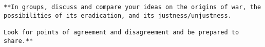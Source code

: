 \documentclass[letterpaper]{article}
\begin{document}
\begin{verbatim}
**In groups, discuss and compare your ideas on the origins of war, the possibilities of its eradication, and its justness/unjustness. 

Look for points of agreement and disagreement and be prepared to share.**
\end{verbatim}
\end{document}
